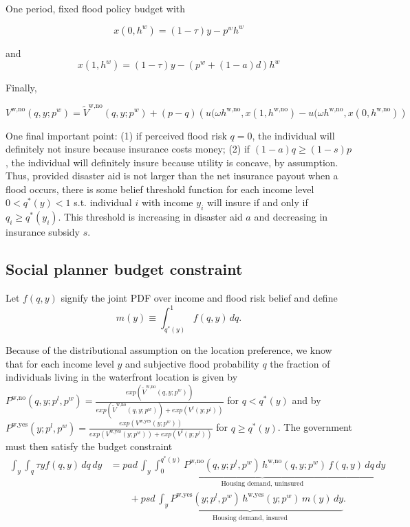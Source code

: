 \documentclass{article}
\begin{document}
\begin{section}{One period, fixed flood policy budget}
with

\[
x(0,h^w)=(1-\tau)y-p^wh^w
\]

and
\[
x(1,h^w)=(1-\tau)y-(p^w+(1-a)d)h^w
\]

Finally,

\begin{equation}
V^{\text{w,no}}(q,y;p^w)=\tilde{V}^{\text{w,no}}(q,y;p^w)+(p-q)\left(u(\omega h^{\text{w,no}}, x(1,h^{\text{w,no}})-u(\omega h^{\text{w,no}}, x(0,h^{\text{w,no}})\right) \nonumber
\end{equation}

One final important point: (1) if perceived flood risk $q=0$, the individual will definitely not insure because insurance costs money; (2) if $(1-a)q\geq (1-s)p$, the individual will definitely insure because utility is concave, by assumption. Thus, provided disaster aid is not larger than the net insurance payout when a flood occurs, there is some belief threshold function for each income level $0<q^{*}(y)<1$ s.t. individual $i$ with income $y_i$ will insure if and only if $q_i\geq q^{*}(y_i)$. This threshold is increasing in disaster aid $a$ and decreasing in insurance subsidy $s$. 

\subsection{Social planner budget constraint}

Let $f(q,y)$ signify the joint PDF over income and flood risk belief and define
\begin{equation}
m(y)\equiv \int_{q^{*}(y)}^{1} f(q,y)\,dq.
\end{equation}

Because of the distributional assumption on the location preference, we know that for each income level $y$ and subjective flood probability $q$ the fraction of individuals living in the waterfront location is given by $P^{\text{w,no}}(q,y;p^l,p^w)=\frac{exp({\tilde{V}^{\text{w,no}}(q,y;p^w)})}{exp({\tilde{V}^{\text{w,no}}(q,y;p^w)})+exp(V^{l}(y;p^l))}$ for $q<q^{*}(y)$ and by $P^{\text{w,yes}}(y;p^l,p^w)=\frac{exp({V^{\text{w,yes}}(y;p^w)})}{exp({V^{\text{w,yes}}(y;p^w)})+exp(V^{l}(y;p^l))}$ for $q\geq q^{*}(y)$. The government must then satisfy the budget constraint
\begin{align}
\int_y\int_q \tau y f(q,y)\,dq\,dy
&=
pad\,
\underbrace{
\int_y\int_{0}^{q^{*}(y)}
P^{\text{w,no}}(q,y;p^l,p^w)\,h^{\text{w,no}}(q,y;p^w)\,f(q,y)\,dq\,dy
}_{\text{Housing demand, uninsured}}
\nonumber\\
&\qquad
+
psd\,
\underbrace{
\int_y
P^{\text{w,yes}}(y;p^l,p^w)\,h^{\text{w,yes}}(y;p^w)\,m(y)\,dy
}_{\text{Housing demand, insured}}.
\end{align}

\end{section}
\end{document}

